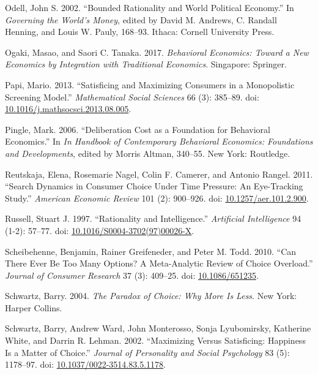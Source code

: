 \documentclass[
  11pt,
  letterpaper,
  DIV=11,
  numbers=noendperiod,
  twoside]{scrartcl}
\newlength{\cslhangindent}
\newenvironment{CSLReferences}[2] %
 {\begin{list}{}{%
  \setlength{\itemindent}{0pt}
  \setlength{\leftmargin}{0pt}
  \setlength{\parsep}{0pt}
  \ifodd #1
   \setlength{\leftmargin}{\cslhangindent}
   \setlength{\itemindent}{-1\cslhangindent}
  \fi
  \setlength{\itemsep}{#2\baselineskip}}}
 {\end{list}}
\begin{document}
\begin{CSLReferences}{1}{0}
Odell, John S. 2002. {``Bounded Rationality and World Political
Economy.''} In \emph{Governing the World's Money}, edited by David M.
Andrews, C. Randall Henning, and Louis W. Pauly, 168--93. Ithaca:
Cornell University Press.

Ogaki, Masao, and Saori C. Tanaka. 2017. \emph{Behavioral Economics:
Toward a New Economics by Integration with Traditional Economics}.
Singapore: Springer.

Papi, Mario. 2013. {``Satisficing and Maximizing Consumers in a
Monopolistic Screening Model.''} \emph{Mathematical Social Sciences} 66
(3): 385--89. doi:
\href{https://doi.org/10.1016/j.mathsocsci.2013.08.005}{10.1016/j.mathsocsci.2013.08.005}.

Pingle, Mark. 2006. {``Deliberation Cost as a Foundation for Behavioral
Economics.''} In \emph{In Handbook of Contemporary Behavioral Economics:
Foundations and Developments}, edited by Morris Altman, 340--55. New
York: Routledge.

Reutskaja, Elena, Rosemarie Nagel, Colin F. Camerer, and Antonio Rangel.
2011. {``Search Dynamics in Consumer Choice Under Time Pressure: An
Eye-Tracking Study.''} \emph{American Economic Review} 101 (2):
900--926. doi:
\href{https://doi.org/10.1257/aer.101.2.900}{10.1257/aer.101.2.900}.

Russell, Stuart J. 1997. {``Rationality and Intelligence.''}
\emph{Artificial Intelligence} 94 (1-2): 57--77. doi:
\href{https://doi.org/10.1016/S0004-3702(97)00026-X}{10.1016/S0004-3702(97)00026-X}.

Scheibehenne, Benjamin, Rainer Greifeneder, and Peter M. Todd. 2010.
{``Can There Ever Be Too Many Options? A Meta-Analytic Review of Choice
Overload.''} \emph{Journal of Consumer Research} 37 (3): 409--25. doi:
\href{https://doi.org/10.1086/651235}{10.1086/651235}.

Schwartz, Barry. 2004. \emph{The Paradox of Choice: Why More Is Less}.
New York: Harper Collins.

Schwartz, Barry, Andrew Ward, John Monterosso, Sonja Lyubomirsky,
Katherine White, and Darrin R. Lehman. 2002. {``Maximizing Versus
Satisficing: Happiness Is a Matter of Choice.''} \emph{Journal of
Personality and Social Psychology} 83 (5): 1178--97. doi:
\href{https://doi.org/10.1037/0022-3514.83.5.1178}{10.1037/0022-3514.83.5.1178}.


\end{CSLReferences}
\end{document}

